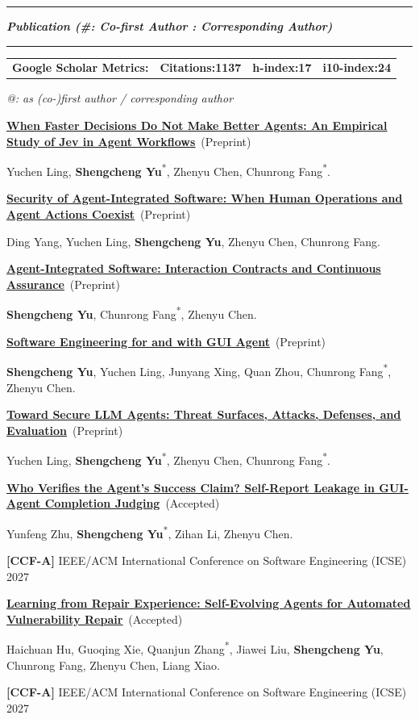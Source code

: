 \documentclass[12pt,a4paper]{article}
\newcommand{\cvsection}[1]{%
  \par\vspace{5pt}%
  \noindent\begin{minipage}{\linewidth}%
    \rule{\linewidth}{1.3pt}\par%
    \parbox[c][31pt][c]{\linewidth}{%
      \fontsize{20}{22}\selectfont\bfseries\itshape #1%
    }\par%
    \rule{\linewidth}{1.3pt}%
  \end{minipage}\par\nobreak\vspace{4pt}\nobreak%
}
\newcommand{\me}{\textbf{Shengcheng Yu}}
\newcommand{\corr}{\textsuperscript{*}}
\newcommand{\ccf}[1]{\textbf{[#1]}}
\newcommand{\publication}[5]{%
  \begin{samepage}%
  \href{#5}{\textbf{\uline{#1}}}#2\par\nopagebreak[4]
  #3.\par\nopagebreak[4]
  #4\par
  \end{samepage}%
  \vspace{4.8pt}%
}
\begin{document}
\cvsection{Publication {\normalfont\fontsize{9}{10}\selectfont (\#: Co-first Author \quad *: Corresponding Author)}}

\begin{center}
\fontsize{10}{12}\selectfont
\begin{tabular*}{0.82\linewidth}{@{\extracolsep{\fill}}cccc@{}}
\textbf{Google Scholar Metrics:} &
\textbf{Citations:1137} &
\textbf{h-index:17} &
\textbf{i10-index:24}
\end{tabular*}
\end{center}
\vspace{-4pt}
{\raggedleft\fontsize{9}{11}\selectfont\itshape @: as (co-)first author / corresponding author\par}
\vspace{3pt}

\begingroup
\fontsize{10}{14.4}\selectfont

\publication
{When Faster Decisions Do Not Make Better Agents: An Empirical Study of Jev in Agent Workflows}
{\ (Preprint)}
{Yuchen Ling, \me\corr, Zhenyu Chen, Chunrong Fang\corr}
{}
{http://arxiv.org/abs/2610.13092}

\publication
{Security of Agent-Integrated Software: When Human Operations and Agent Actions Coexist}
{\ (Preprint)}
{Ding Yang, Yuchen Ling, \me, Zhenyu Chen, Chunrong Fang}
{}
{https://arxiv.org/abs/2609.23226}

\publication
{Agent-Integrated Software: Interaction Contracts and Continuous Assurance}
{\ (Preprint)}
{\me, Chunrong Fang\corr, Zhenyu Chen}
{}
{https://arxiv.org/abs/2609.11381}

\publication
{Software Engineering for and with GUI Agent}
{\ (Preprint)}
{\me, Yuchen Ling, Junyang Xing, Quan Zhou, Chunrong Fang\corr, Zhenyu Chen}
{}
{https://arxiv.org/abs/2608.09278}

\publication
{Toward Secure LLM Agents: Threat Surfaces, Attacks, Defenses, and Evaluation}
{\ (Preprint)}
{Yuchen Ling, \me\corr, Zhenyu Chen, Chunrong Fang\corr}
{}
{https://arxiv.org/abs/2606.10749}

\publication
{Who Verifies the Agent's Success Claim? Self-Report Leakage in GUI-Agent Completion Judging}
{\ (Accepted)}
{Yunfeng Zhu, \me\corr, Zihan Li, Zhenyu Chen}
{\ccf{CCF-A} IEEE/ACM International Conference on Software Engineering (ICSE) 2027}
{http://arxiv.org/abs/2610.29609}

\publication
{Learning from Repair Experience: Self-Evolving Agents for Automated Vulnerability Repair}
{\ (Accepted)}
{Haichuan Hu, Guoqing Xie, Quanjun Zhang\corr, Jiawei Liu, \me, Chunrong Fang, Zhenyu Chen, Liang Xiao}
{\ccf{CCF-A} IEEE/ACM International Conference on Software Engineering (ICSE) 2027}
{https://arxiv.org/abs/2605.30105}
\end{document}
